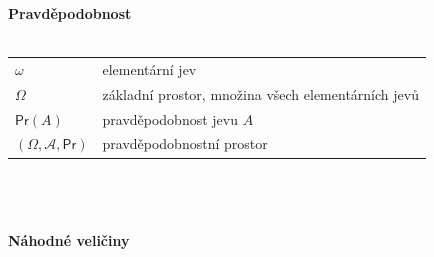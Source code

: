 \documentclass[a4paper,12pt]{report}
\theoremstyle{definition} \newtheorem{definice}[veta]{Definice}
\theoremstyle{remark}
\begin{document}
\normalsize
\textbf{Pravděpodobnost}\\\\
   \begin{tabular}{p{4cm} p{9.3cm}}
   $\omega$				        & elementární jev\\
   $\Omega$                                          &   základní prostor, množina všech elementárních jevů \\
   $\mathsf{Pr}(A)$                               &  pravděpodobnost jevu $A$ \\
   $(\Omega,\mathcal{A}, \mathsf{Pr})$                         &   pravděpodobnostní prostor \\
   \end{tabular}\\\\\\
%
%
%
\textbf{Náhodné veličiny}\\\\
\end{document}
